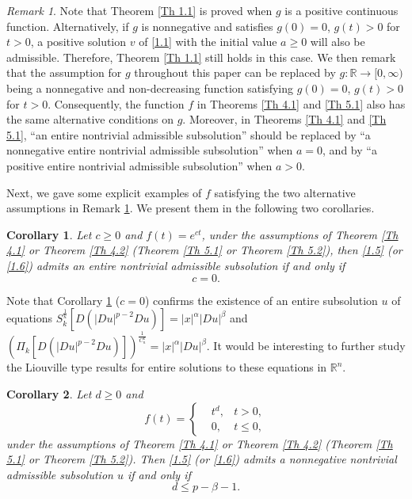 \documentclass[a4paper,11pt]{amsart}
\theoremstyle{plain}
\newtheorem{Corollary}{Corollary}[section]
\theoremstyle{remark}
\newtheorem{remark}{Remark}
\numberwithin{equation}{section}
\numberwithin{figure}{section}
\numberwithin{remark}{section}
\begin{document}
\begin{sloppypar}
\begin{remark}\label{Re 6.6}
Note that Theorem \ref{Th 1.1} is proved when $g$ is a positive continuous function.
Alternatively, if $g$ is nonnegative and satisfies $g(0)=0$, $g(t)>0$ for $t>0$, a positive solution $v$ of \eqref{1.1} with the initial value $a\ge0$ will also be admissible. Therefore, Theorem \ref{Th 1.1} still holds in this case.
We then remark that the assumption for $g$ throughout this paper can be replaced by $g: \mathbb{R} \to [0, \infty)$ being a nonnegative and non-decreasing function satisfying $g(0)=0$, $g(t)>0$ for $t>0$. Consequently, the function $f$ in Theorems \ref{Th 4.1} and \ref{Th 5.1} also has the same alternative conditions on $g$. Moreover, in Theorems \ref{Th 4.1} and \ref{Th 5.1}, ``an entire nontrivial admissible subsolution'' should be replaced by ``a nonnegative entire nontrivial admissible subsolution'' when $a=0$, and by ``a positive entire nontrivial admissible subsolution'' when $a>0$. 
\end{remark}


Next, we gave some explicit examples of $f$ satisfying the two alternative assumptions in Remark \ref{Re 6.6}. We present them in the following two corollaries.
\begin{Corollary}\label{Co 1.1}
Let $c\geq 0$ and $f(t)=e^{c t}$, under the assumptions of Theorem \ref{Th 4.1} or Theorem \ref{Th 4.2}  (Theorem \ref{Th 5.1} or Theorem \ref{Th 5.2}), then \eqref{1.5} (or \eqref{1.6}) admits an entire nontrivial admissible subsolution  if and only if 
$$c=0.$$
\end{Corollary}

Note that Corollary \ref{Co 1.1} ($c =0$) confirms the existence of an entire subsolution $u$ of equations $S_k^{\frac{1}{k}} [D(|Du|^{p-2}Du)] = |x|^\alpha |Du|^\beta$ and $\left (\Pi_k[D(|Du|^{p-2}Du)] \right )^{\frac{1}{C_n^k}} = |x|^\alpha  |Du|^\beta$. It would be interesting to further study the Liouville type results for entire solutions to these equations in $\mathbb{R}^n$.



\begin{Corollary}\label{Co 1.2}
	Let $d\geq 0$ and
	\begin{equation*}
		f(t)=
		\left\{
		\begin{split}
			&t^d,&t>0,\\
			&0,&t\leq0,
		\end{split}
		\right.
	\end{equation*} under the assumptions of Theorem \ref{Th 4.1} or Theorem \ref{Th 4.2} (Theorem \ref{Th 5.1} or Theorem \ref{Th 5.2}).  Then \eqref{1.5} (or \eqref{1.6}) admits a nonnegative nontrivial admissible subsolution $u$ if and only if 
	$$d\leq p-\beta -1.$$
\end{Corollary}


\end{sloppypar}
\end{document}
